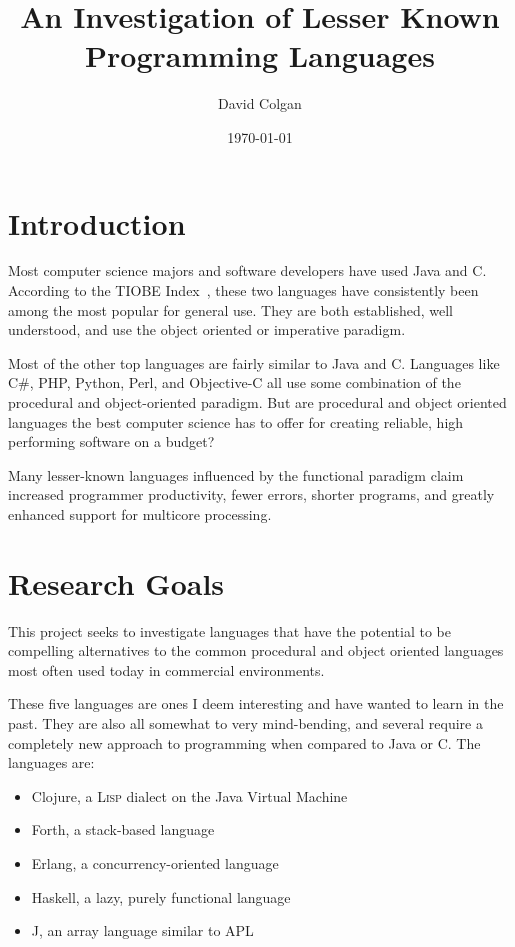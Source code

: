 \documentclass{article}
\title{An Investigation of Lesser Known Programming Languages}
\author{David Colgan}
\date{\today}
\begin{document}
\maketitle

\section{Introduction}

Most computer science majors and software developers have used Java and C.
According to the TIOBE Index~\cite{tiobe}, these two languages have
consistently been among the most popular for general use.  They are both
established, well understood, and use the object oriented or imperative
paradigm.

Most of the other top languages are fairly similar to Java and C.  Languages
like C\#, PHP, Python, Perl, and Objective-C all use some combination of the
procedural and object-oriented paradigm.   But are procedural and object
oriented languages the best computer science has to offer for creating
reliable, high performing software on a budget?

Many lesser-known languages influenced by the functional paradigm claim
increased programmer productivity, fewer errors, shorter programs, and greatly
enhanced support for multicore processing.

\section{Research Goals}

This project seeks to investigate languages that have the potential to be
compelling alternatives to the common procedural and object oriented languages
most often used today in commercial environments.

These five languages are ones I deem interesting and have wanted to learn in
the past.  They are also all somewhat to very mind-bending, and several require
a completely new approach to programming when compared to Java or C.  The
languages are:

\begin{itemize}
\item Clojure, a \textsc{Lisp} dialect on the Java Virtual Machine

\item Forth, a stack-based language

\item Erlang, a concurrency-oriented language

\item Haskell, a lazy, purely functional language

\item J, an array language similar to APL
\end{itemize}
\end{document}
